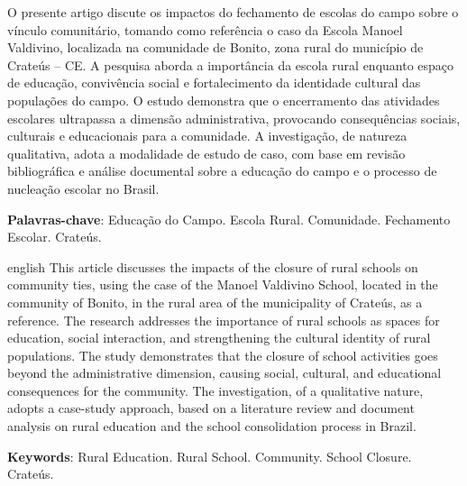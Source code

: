 \documentclass[
  12pt,
  openright,
  twoside,
  a4paper,
  english,
  brazilian,
  sumario=tradicional
]{abntex2}
\newcommand{\listofquadrosname}{Lista de quadros}
\begin{document}
\setlength{\absparsep}{18pt}
\begin{resumo}
O presente artigo discute os impactos do fechamento de escolas do campo sobre o vínculo comunitário, tomando como referência o caso da Escola Manoel Valdivino, localizada na comunidade de Bonito, zona rural do município de Crateús -- CE. A pesquisa aborda a importância da escola rural enquanto espaço de educação, convivência social e fortalecimento da identidade cultural das populações do campo. O estudo demonstra que o encerramento das atividades escolares ultrapassa a dimensão administrativa, provocando consequências sociais, culturais e educacionais para a comunidade. A investigação, de natureza qualitativa, adota a modalidade de estudo de caso, com base em revisão bibliográfica e análise documental sobre a educação do campo e o processo de nucleação escolar no Brasil.
\vspace{\onelineskip}

\noindent
\textbf{Palavras-chave}: Educação do Campo. Escola Rural. Comunidade. Fechamento Escolar. Crateús.
\end{resumo}

\begin{resumo}[Abstract]
  \begin{otherlanguage*}{english}
  This article discusses the impacts of the closure of rural schools on community ties, using the case of the Manoel Valdivino School, located in the community of Bonito, in the rural area of the municipality of Crateús, as a reference. The research addresses the importance of rural schools as spaces for education, social interaction, and strengthening the cultural identity of rural populations. The study demonstrates that the closure of school activities goes beyond the administrative dimension, causing social, cultural, and educational consequences for the community. The investigation, of a qualitative nature, adopts a case-study approach, based on a literature review and document analysis on rural education and the school consolidation process in Brazil.
  \vspace{\onelineskip}

  \noindent
  \textbf{Keywords}: Rural Education. Rural School. Community. School Closure. Crateús.
  \end{otherlanguage*}
\end{resumo}

\pdfbookmark[0]{\listofquadrosname}{loq}
\listofquadros*
\cleardoublepage
\end{document}
